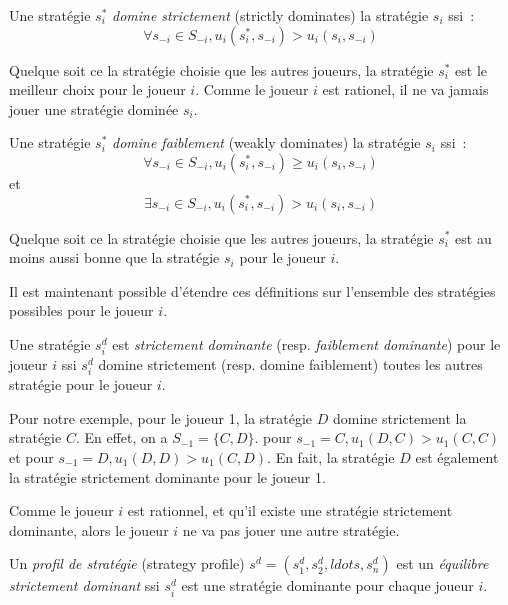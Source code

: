 \begin{defn}
Une strat\'egie $s^{*}_{i}$ \emph{domine strictement} (strictly dominates) la strat\'egie $s_i$ ssi\ :
$$
\forall s_{-i} \in S_{-i}, u_i(s^{*}_{i}, s_{-i}) > u_i(s_{i}, s_{-i}) 
$$
\end{defn}

Quelque soit ce la strat\'egie choisie que les autres joueurs, la strat\'egie $s^{*}_{i}$ est le meilleur choix pour le joueur $i$. Comme le joueur $i$ est rationel, il ne va jamais jouer une strat\'egie domin\'ee $s_i$. 

\begin{defn}
Une strat\'egie $s^{*}_{i}$ \emph{domine faiblement} (weakly dominates) la strat\'egie $s_i$ ssi\ :
$$
\forall s_{-i} \in S_{-i}, u_i(s^{*}_{i}, s_{-i}) \geq u_i(s_{i}, s_{-i}) 
$$
et
$$
\exists s_{-i} \in S_{-i}, u_i(s^{*}_{i}, s_{-i}) > u_i(s_{i}, s_{-i})
$$
\end{defn}

Quelque soit ce la strat\'egie choisie que les autres joueurs, la strat\'egie $s^{*}_{i}$ est au moins aussi bonne que la strat\'egie $s_i$ pour le joueur $i$. 


Il est maintenant possible d'\'etendre ces d\'efinitions sur l'ensemble des strat\'egies possibles pour le joueur $i$.

\begin{defn}
Une strat\'egie $s^{d}_{i}$ est \emph{strictement dominante} (resp. \emph{faiblement dominante}) pour le joueur $i$ ssi $s^{d}_{i}$ domine strictement (resp. domine faiblement) toutes les autres strat\'egie pour le joueur $i$.
\end{defn}

Pour notre exemple, pour le joueur 1, la strat\'egie $D$ domine strictement la strat\'egie $C$. En effet, on a $S_{-1} = \{C, D\}$. pour $s_{-1} = {C}, u_1(D, C) > u_1(C, C)$ et pour $s_{-1} = {D}, u_1(D, D) > u_1(C, D)$. En fait, la strat\'egie $D$ est \'egalement la strat\'egie strictement dominante pour le joueur 1.

Comme le joueur $i$ est rationnel, et qu'il existe une strat\'egie strictement dominante, alors le joueur $i$ ne va pas jouer une autre strat\'egie.

\begin{defn}
Un \emph{profil de strat\'egie} (strategy profile) $s^{d} = (s^d_1, s^d_2, ldots, s^d_n)$ est un \emph{\'equilibre strictement dominant} ssi $s^d_i$ est une strat\'egie dominante pour chaque joueur $i$.
\end{defn}


